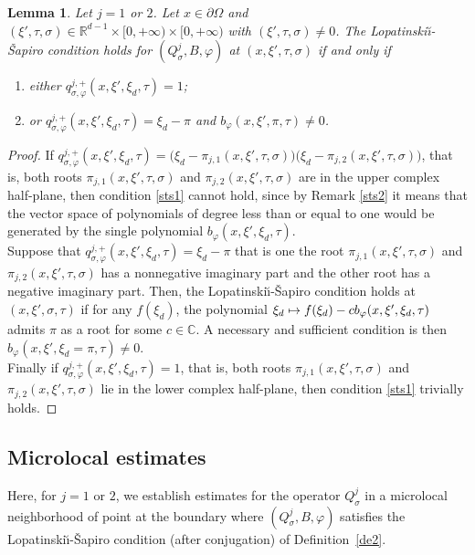 \documentclass[10pt]{amsart}
\newcommand\mto{\mathchoice{\longmapsto}{\mapsto}{\mapsto}{\mapsto}}
\theoremstyle{plain}
\newtheorem{lemma}[theorem]{Lemma}
\theoremstyle{definition}
\def\R{\mathbb{R}}
\def\C{\mathbb{C}}
\newcommand{\LS}{Lopatinski\u{\i}-\v{S}apiro\xspace}
\newcommand{\nhd}{neighborhood\xspace}
\newcommand{\Qsig}{Q_{\sigma}}
\newcommand{\qconj}{q_{\sigma,\varphi}}
\begin{document}
\begin{lemma}
\label{sl1}
Let $j=1$ or $2$. Let $x \in \partial\Omega$ and $(\xi',\tau, \sigma)\in
\R^{d-1}\times [0,+\infty) \times
[0,+\infty)$ with $(\xi',\tau,\sigma)\neq 0$. The \LS condition
holds for $(\Qsig^j,B,\varphi)$ at $(x,\xi',\tau,\sigma)$
if and only if
\begin{enumerate}
\item either $\qconj^{j,+} (x,\xi',\xi_d,\tau)=1$;
\item or
$\qconj^{j,+} (x,\xi',\xi_d,\tau)=\xi_d-\pi$
and $b_{\varphi}(x,\xi',\pi,\tau)\neq 0$.
\end{enumerate}
\end{lemma}
\begin{proof}
If
$\qconj^{j,+} (x,\xi',\xi_d,\tau)=\big(\xi_d-\pi_{j,1}
(x,\xi',\tau,\sigma)\big)
\big(\xi_d-\pi_{j,2} (x,\xi',\tau,\sigma)\big)$,
that is, both roots $\pi_{j,1} (x,\xi',\tau,\sigma)$ and $\pi_{j,2} (x,\xi',\tau,\sigma)$ are in the upper
complex half-plane, then condition \eqref{sts1} cannot hold, since
by Remark \ref{sts2} it means that the vector space of polynomials
of degree less than or equal to one would be generated by the single polynomial $b_{\varphi}(x,\xi',\xi_d,\tau)$.\\
Suppose that $\qconj^{j,+} (x,\xi',\xi_d,\tau)=\xi_d-\pi$ that is
one the root $\pi_{j,1} (x,\xi',\tau,\sigma)$ and $\pi_{j,2} (x,\xi',\tau,\sigma)$ has a nonnegative imaginary
part and the other root has a negative imaginary part. Then, the \LS condition holds at $(x,\xi',\sigma,\tau)$ if for any $f(\xi_d)$, the polynomial $\xi_d\mto f(\xi_d)-c b_{\varphi}(x,\xi',\xi_d,\tau)$ admits $\pi$ as a root for some $c\in\C$. A necessary and sufficient condition is then $b_{\varphi}(x,\xi',\xi_d=\pi,\tau)\neq 0$.\\
Finally if $\qconj^{j,+} (x,\xi',\xi_d,\tau)=1$, that
is, both roots $\pi_{j,1} (x,\xi',\tau,\sigma)$ and $\pi_{j,2} (x,\xi',\tau,\sigma)$ lie in the lower complex
half-plane, then condition \eqref{sts1} trivially holds.
\end{proof}

\subsection{Microlocal estimates}

Here, for $j=1$ or $2$, we establish estimates for the operator
$\Qsig^j$ in a microlocal \nhd of point at the boundary where
$(\Qsig^j,B,\varphi)$ satisfies the \LS condition (after conjugation)
of Definition~\ref{de2}.
\end{document}
